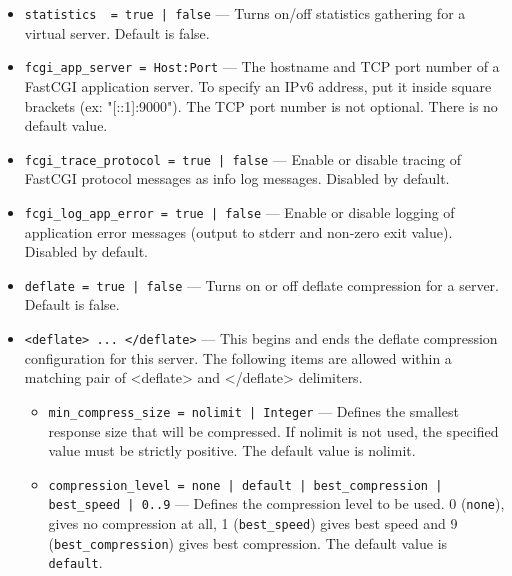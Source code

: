 \documentclass[11pt,oneside,english]{book}
\begin{document}
\begin{itemize}
\item       \verb+statistics  = true | false+ ---
             Turns on/off statistics gathering for a virtual server. Default is
             false.

\item       \verb+fcgi_app_server = Host:Port+ ---
             The hostname and TCP port number of a FastCGI application
             server. To specify an IPv6 address, put it inside square
             brackets (ex: "[::1]:9000"). The TCP port number is not
             optional. There is no default value.

\item       \verb+fcgi_trace_protocol = true | false+ ---
             Enable or disable tracing of FastCGI protocol messages as info log
             messages. Disabled by default.

\item       \verb+fcgi_log_app_error = true | false+ ---
             Enable or disable logging of application error messages (output to
             stderr and non-zero exit value). Disabled by default.

\item       \verb+deflate = true | false+ ---
             Turns on or off deflate compression for a server. Default is
             false.

\item       \verb+<deflate> ... </deflate>+ ---
             This begins and ends the deflate compression configuration for this
             server. The following items are allowed within a matching pair of
             <deflate> and </deflate> delimiters.

             \begin{itemize}
             \item \verb+min_compress_size = nolimit | Integer+ --- Defines the
               smallest response size that will be compressed. If nolimit is not
               used, the specified value must be strictly positive. The default
               value is nolimit.

             \item \verb+compression_level = none | default | best_compression | best_speed | 0..9+ ---
               Defines the compression level to be used. 0 (\verb+none+),
               gives no compression at all, 1 (\verb+best_speed+) gives
               best speed and 9 (\verb+best_compression+) gives best
               compression. The default value is \verb+default+.


\end{itemize}
\end{itemize}
\end{document}
